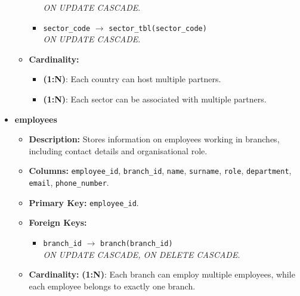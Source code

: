 \documentclass[12pt,a4paper]{article}
\begin{document}
\begin{itemize}
\begin{itemize}
\begin{itemize}
            \hspace{1cm} \textit{ON UPDATE CASCADE}.
            \item \texttt{sector\_code} $\to$ \texttt{sector\_tbl(sector\_code)} \\
            \hspace{1cm} \textit{ON UPDATE CASCADE}.
        \end{itemize}
        \item \textbf{Cardinality:}
        \begin{itemize}
            \item \textbf{(1:N)}: Each country can host multiple partners.
            \item \textbf{(1:N)}: Each sector can be associated with multiple partners.
        \end{itemize}
    \end{itemize}

     \item \textbf{employees}
    \begin{itemize}
        \item \textbf{Description:} Stores information on employees working in branches, including contact details and organisational role.
        \item \textbf{Columns:} \texttt{employee\_id}, \texttt{branch\_id}, \texttt{name}, \texttt{surname}, \texttt{role}, \texttt{department}, \texttt{email}, \texttt{phone\_number}.
        \item \textbf{Primary Key:} \texttt{employee\_id}.
        \item \textbf{Foreign Keys:}
        \begin{itemize}
            \item \texttt{branch\_id} $\to$ \texttt{branch(branch\_id)} \\
            \hspace{1cm} \textit{ON UPDATE CASCADE, ON DELETE CASCADE}.
        \end{itemize}
        \item \textbf{Cardinality:} \textbf{(1:N)}: Each branch can employ multiple employees, while each employee belongs to exactly one branch.
    \end{itemize}



\end{itemize}
\end{document}
